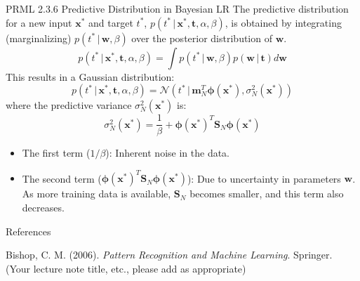 \documentclass{beamer} %
\newcommand{\mat}[1]{\mathbf{#1}}
\newcommand{\vect}[1]{\mathbf{#1}}
\newcommand{\given}{\,|\,}
\begin{document}
\begin{frame}{PRML 2.3.6 Predictive Distribution in Bayesian LR}
  The predictive distribution for a new input $\vect{x}^*$ and target $t^*$, $p(t^* \given \vect{x}^*, \vect{t}, \alpha, \beta)$, is obtained by integrating (marginalizing) $p(t^* \given \vect{w}, \beta)$ over the posterior distribution of $\vect{w}$.
  \begin{equation*}
    p(t^* \given \vect{x}^*, \vect{t}, \alpha, \beta) = \int p(t^* \given \vect{w}, \beta) p(\vect{w} \given \vect{t}) d\vect{w}
  \end{equation*}
  This results in a Gaussian distribution:
  \begin{equation*}
    p(t^* \given \vect{x}^*, \vect{t}, \alpha, \beta) = \mathcal{N}(t^* \given \vect{m}_N^T \boldsymbol{\phi}(\vect{x}^*), \sigma_N^2(\vect{x}^*))
  \end{equation*}
  where the predictive variance $\sigma_N^2(\vect{x}^*)$ is:
  \begin{equation*}
    \sigma_N^2(\vect{x}^*) = \frac{1}{\beta} + \boldsymbol{\phi}(\vect{x}^*)^T \mat{S}_N \boldsymbol{\phi}(\vect{x}^*)
  \end{equation*}
  \begin{itemize}
    \item The first term ($1/\beta$): Inherent noise in the data.
    \item The second term ($\boldsymbol{\phi}(\vect{x}^*)^T \mat{S}_N \boldsymbol{\phi}(\vect{x}^*)$): Due to uncertainty in parameters $\vect{w}$. As more training data is available, $\mat{S}_N$ becomes smaller, and this term also decreases.
  \end{itemize}
\end{frame}


\begin{frame}[allowframebreaks]{References}
  \begin{thebibliography}{9}
    Bishop, C. M. (2006). \textit{Pattern Recognition and Machine Learning}. Springer.
    (Your lecture note title, etc., please add as appropriate)
  \end{thebibliography}
\end{frame}
\end{document}
